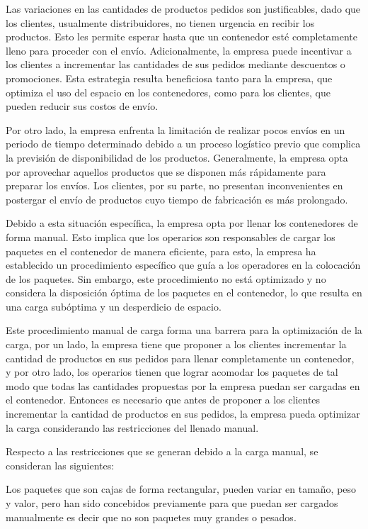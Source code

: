 Las variaciones en las cantidades de productos pedidos son justificables, dado que los clientes, usualmente distribuidores, no tienen urgencia en recibir los productos. Esto les permite esperar hasta que un contenedor esté completamente lleno para proceder con el envío. Adicionalmente, la empresa puede incentivar a los clientes a incrementar las cantidades de sus pedidos mediante descuentos o promociones. Esta estrategia resulta beneficiosa tanto para la empresa, que optimiza el uso del espacio en los contenedores, como para los clientes, que pueden reducir sus costos de envío.

Por otro lado, la empresa enfrenta la limitación de realizar pocos envíos en un periodo de tiempo determinado debido a un proceso logístico previo que complica la previsión de disponibilidad de los productos. Generalmente, la empresa opta por aprovechar aquellos productos que se disponen más rápidamente para preparar los envíos. Los clientes, por su parte, no presentan inconvenientes en postergar el envío de productos cuyo tiempo de fabricación es más prolongado.

Debido a esta situación específica, la empresa opta por llenar los contenedores de forma manual. Esto implica que los operarios son responsables de cargar los paquetes en el contenedor de manera eficiente, para esto, la empresa ha establecido un procedimiento específico que guía a los operadores en la colocación de los paquetes. Sin embargo, este procedimiento no está optimizado y no considera la disposición óptima de los paquetes en el contenedor, lo que resulta en una carga subóptima y un desperdicio de espacio.

Este procedimiento manual de carga forma una barrera para la optimización de la carga, por un lado, la empresa tiene que proponer a los clientes incrementar la cantidad de productos en sus pedidos para llenar completamente un contenedor, y por otro lado, los operarios tienen que lograr acomodar los paquetes de tal modo que todas las cantidades propuestas por la empresa puedan ser cargadas en el contenedor. Entonces es necesario que antes de proponer a los clientes incrementar la cantidad de productos en sus pedidos, la empresa pueda optimizar la carga considerando las restricciones del llenado manual.

Respecto a las restricciones que se generan debido a la carga manual, se consideran las siguientes:

Los paquetes que son cajas de forma rectangular, pueden variar en tamaño, peso y valor, pero han sido concebidos previamente para que puedan ser cargados manualmente es decir que no son paquetes muy grandes o pesados.

